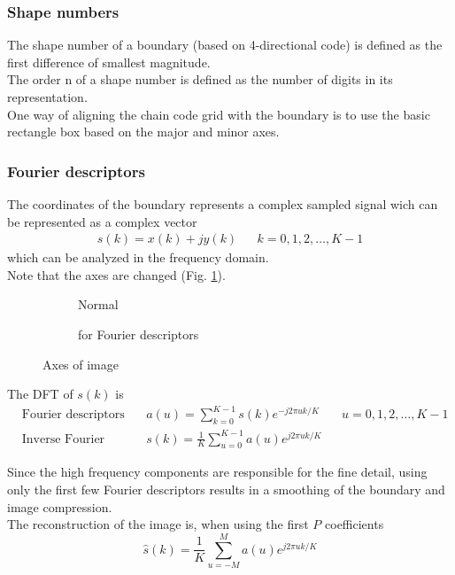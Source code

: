 \subsubsection{Shape numbers}
The shape number of a boundary (based on 4-directional code) is defined as the first difference of smallest magnitude.\\
The order n of a shape number is defined as the number of digits in its representation.\\
One way of aligning the chain code grid with the boundary is to use the basic rectangle box based on the major and minor axes.

\subsubsection{Fourier descriptors}
The coordinates of the boundary represents a complex sampled signal wich can be represented as a complex vector
\begin{align*}
s(k)=x(k)+jy(k) && k=0,1,2,\ldots,K-1
\end{align*}
which can be analyzed in the frequency domain.\\

Note that the axes are changed (Fig. \ref{fig:axes}).
\begin{figure}[h]
	\begin{subfigure}{0.5\textwidth}
		 \centering
		 
		 \caption{Normal}
	\end{subfigure}
	\begin{subfigure}{0.5\textwidth}
		\centering
		
		\caption{for Fourier descriptors}
	\end{subfigure}
	\caption{Axes of image}
  \label{fig:axes}
\end{figure}

The DFT of $s(k)$ is \begin{align*}
& \text{Fourier descriptors of the boundary:} && a(u)=\sum\limits_{k=0}^{K-1}s(k)e^{-j2\pi uk/K} && u=0,1,2,\ldots,K-1\\
& \text{Inverse Fourier transform:} && s(k)=\frac{1}{K}\sum\limits_{u=0}^{K-1}a(u)e^{j2\pi uk/K}
\end{align*}

Since the high frequency components are responsible for the fine detail, using only the first few Fourier descriptors results in a smoothing of the boundary and image compression.\\
The reconstruction of the image is, when using the first $P$ coefficients
	\[
	\hat{s}(k) = \frac{1}{K} \sum\limits_{u=-M}^{M} a(u) e^{j 2 \pi u k / K}
	\]

